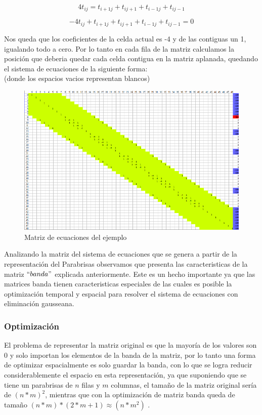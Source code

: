 \[
4 t_{ij} = t_{i+1 j} + t_{i j+1} + t_{i-1 j} + t_{i j-1}
\]

\[
 - 4 t_{ij} + t_{i+1 j} + t_{i j+1} + t_{i-1 j} + t_{i j-1}  = 0
\]

Nos queda que los coeficientes de la celda actual es -4 y de las contiguas un 1, igualando todo a cero.
Por lo tanto en cada fila de la matriz calculamos la posición que deberia quedar cada celda contigua en la matriz aplanada, quedando el sistema de ecuaciones de la siguiente forma: \\
(donde los espacios vacios representan blancos)
\begin{figure}
\begin{center}
\includegraphics[scale=0.60]{imagenes/matrizej.png} 
\caption{Matriz de ecuaciones del ejemplo} 
\end{center}
\end{figure}


\newpage

Analizando la matriz del sistema de ecuaciones que se genera a partir de la representación del Parabrisas observamos que presenta las caracteristicas de la matriz $``banda"$ explicada anteriormente. 
Este es un hecho importante ya que las matrices banda tienen caracteristicas especiales de las cuales es posible la optimización temporal y espacial para resolver el sistema de ecuaciones con eliminación gausseana.

\subsubsection{Optimización}

El problema de representar la matriz original es que la mayoría de los valores son 0 y solo importan los elementos de la banda de la matriz, por lo tanto una forma de optimizar espacialmente es solo guardar la banda, con lo que se logra reducir considerablemente el espacio en esta representación, ya que suponiendo que se tiene un parabrisas de $n$ filas y $m$ columnas, el tamaño de la matriz original sería de $(n*m)^2$, mientras que con la optimización de matriz banda queda de tamaño $(n*m)*(2*m+1) \approx (n*m^2)$ .


